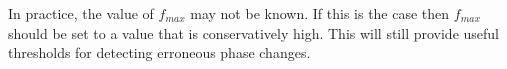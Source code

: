 \documentclass[a4paper]{IEEEtran}
\begin{document}
In practice, the value of $f_{max}$ may not be known. If this is the case then $f_{max}$ should be set to a value that is conservatively high. This will still provide useful thresholds for detecting erroneous phase changes.
% 
\end{document}

